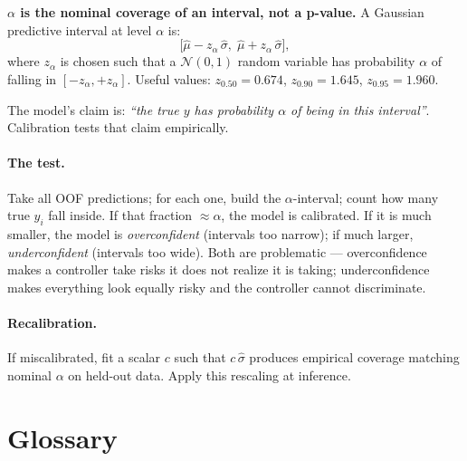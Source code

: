 \documentclass[11pt,a4paper]{article}
\begin{document}
\begin{recapbox}
\textbf{$\alpha$ is the nominal coverage of an interval, not a p-value.} A Gaussian predictive interval at level $\alpha$ is:
\[
\big[\hat\mu - z_\alpha \, \hat\sigma, \; \hat\mu + z_\alpha \, \hat\sigma\big],
\]
where $z_\alpha$ is chosen such that a $\mathcal{N}(0,1)$ random variable has probability $\alpha$ of falling in $[-z_\alpha, +z_\alpha]$. Useful values: $z_{0.50} = 0.674$, $z_{0.90} = 1.645$, $z_{0.95} = 1.960$.

The model's claim is: \emph{``the true $y$ has probability $\alpha$ of being in this interval''}. Calibration tests that claim empirically.
\end{recapbox}

\paragraph{The test.} Take all OOF predictions; for each one, build the $\alpha$-interval; count how many true $y_i$ fall inside. If that fraction $\approx \alpha$, the model is calibrated. If it is much smaller, the model is \emph{overconfident} (intervals too narrow); if much larger, \emph{underconfident} (intervals too wide). Both are problematic --- overconfidence makes a controller take risks it does not realize it is taking; underconfidence makes everything look equally risky and the controller cannot discriminate.

\paragraph{Recalibration.} If miscalibrated, fit a scalar $c$ such that $c \, \hat\sigma$ produces empirical coverage matching nominal $\alpha$ on held-out data. Apply this rescaling at inference.

\section*{Glossary}
\end{document}
